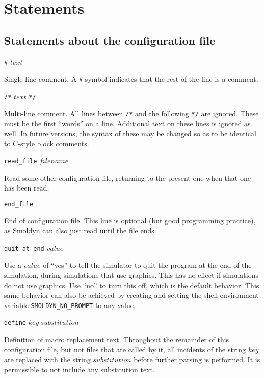 \documentclass {scrbook}
\newcommand {\ttt} {\texttt}
\begin{document}
\chapter{Statements}

\section{Statements about the configuration file}

\begin{description}

\item{\ttt{\#} $text$}

Single-line comment. A \ttt{\#} symbol indicates that the rest of the line is a comment.

\item{\ttt{/*} $text$ \ttt{*/}}

Multi-line comment. All lines between \ttt{/*} and the following \ttt{*/} are ignored. These must be the first ``words'' on a line. Additional text on these lines is ignored as well. In future versions, the syntax of these may be changed so as to be identical to C-style block comments.

\item{\ttt{read\_file} $filename$}

Read some other configuration file, returning to the present one when that one has been read.

\item{\ttt{end\_file}}

End of configuration file. This line is optional (but good programming practice), as Smoldyn can also just read until the file ends.

\item{\ttt{quit\_at\_end} $value$}

Use a $value$ of ``yes'' to tell the simulator to quit the program at the end of the simulation, during simulations that use graphics. This has no effect if simulations do not use graphics. Use ``no'' to turn this off, which is the default behavior. This same behavior can also be achieved by creating and setting the shell environment variable \ttt{SMOLDYN\_NO\_PROMPT} to any value.

\item{\ttt{define} $key\ substitution$}

Definition of macro replacement text. Throughout the remainder of this configuration file, but not files that are called by it, all incidents of the string $key$ are replaced with the string $substitution$ before further parsing is performed. It is permissible to not include any substitution text.


\end{description}
\end{document}
